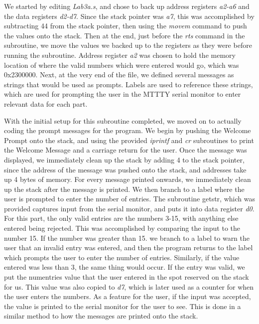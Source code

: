 \documentclass[letterpaper]{article}
\begin{document}
    We started by editing \textit{Lab3a.s}, and chose to back up
    address registers \textit{a2-a6} and the data registers \textit{d2-d7}. Since the stack pointer
    was \textit{a7}, this was accomplished by subtracting 44 from the stack pointer,
    then using the \textit{movem} command to push the values onto the stack. Then at the end, just before
    the \textit{rts} command in the subroutine, we move the values we backed up to the registers
    as they were before running the subroutine. Address register \textit{a2} was chosen to
    hold the memory location of where the valid numbers which were entered would go, which
    was 0x2300000.
    Next, at the very end of the file, we
    defined several messages as strings that would be used as prompts. Labels are used to reference
    these strings, which are used for prompting the user in the MTTTY serial monitor to enter relevant data for each part.

    With the initial setup for this subroutine completed, we moved on to
    actually coding the prompt messages for the program. We begin by
    pushing the Welcome Prompt onto the stack, and using the provided \textit{iprintf}
    and \textit{cr} subroutines to print the Welcome Message and a carriage return for the
    user. Once the message was displayed, we immediately clean up the stack by adding 4
    to the stack pointer, since the address of the message was pushed onto the stack,
    and addresses take up 4 bytes of memory. For every message printed onwards,
    we immediately clean up the stack after the message is printed. We then branch to a label where the user
    is prompted to enter the number of entries. The subroutine getstr, which was provided captures input from the serial monitor,
    and puts it into data register \textit{d0}. For this part, the only
    valid entries are the numbers 3-15, with anything else entered being rejected.
    This was accomplished by comparing the input to the number 15. If the number was
    greater than 15. we branch to a label to warn the user that an invalid entry was entered,
    and then the program returns to the label which prompts the user to enter
    the number of entries. Similarly, if the value entered was less than 3, the same thing would occur.
    If the entry was valid, we put the numentries value that the user entered in the spot reserved on the
    stack for us. This value was also copied to \textit{d7}, which is later used as a counter
    for when the user enters the numbers. As a feature for the user, if the input was
    accepted, the value is printed to the serial monitor for the user to see. This is done
    in a similar method to how the messages are printed onto the stack.
\end{document}
